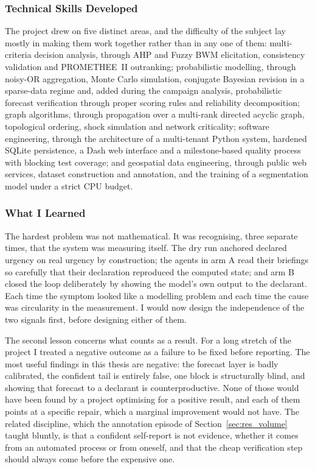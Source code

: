 \subsubsection{Technical Skills Developed}

The project drew on five distinct areas, and the difficulty of the subject lay mostly in
making them work together rather than in any one of them: multi-criteria decision analysis,
through AHP and Fuzzy BWM elicitation, consistency validation and PROMETHEE~II outranking;
probabilistic modelling, through noisy-OR aggregation, Monte Carlo simulation, conjugate
Bayesian revision in a sparse-data regime and, added during the campaign analysis,
probabilistic forecast verification through proper scoring rules and reliability
decomposition; graph algorithms, through propagation over a multi-rank directed acyclic graph,
topological ordering, shock simulation and network criticality; software engineering, through
the architecture of a multi-tenant Python system, hardened SQLite persistence, a Dash web
interface and a milestone-based quality process with blocking test coverage; and geospatial
data engineering, through public web services, dataset construction and annotation, and the
training of a segmentation model under a strict CPU budget.

\subsubsection{What I Learned}

The hardest problem was not mathematical. It was recognising, three separate times, that the
system was measuring itself. The dry run anchored declared urgency on real urgency by
construction; the agents in arm A read their briefings so carefully that their declaration
reproduced the computed state; and arm B closed the loop deliberately by showing the model's
own output to the declarant. Each time the symptom looked like a modelling problem and each
time the cause was circularity in the measurement. I would now design the independence of
the two signals first, before designing either of them.

The second lesson concerns what counts as a result. For a long stretch of the project I
treated a negative outcome as a failure to be fixed before reporting. The most useful
findings in this thesis are negative: the forecast layer is badly calibrated, the confident
tail is entirely false, one block is structurally blind, and showing that forecast to a
declarant is counterproductive. None of those would have been found by a project optimising
for a positive result, and each of them points at a specific repair, which a
marginal improvement would not have. The related discipline, which the annotation episode of
Section~\ref{sec:res_volume} taught bluntly, is that a confident self-report is not evidence,
whether it comes from an automated process or from oneself, and that the cheap verification
step should always come before the expensive one.

